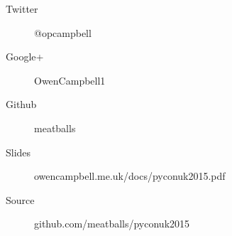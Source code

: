 \documentclass[14pt]{beamer}
\begin{document}
    \begin{frame}{}
      \begin{description}
        \item [Twitter] @opcampbell
        \item [Google+] OwenCampbell1
        \item [Github] meatballs
      \end{description}
      \vfill
      \begin{description}
        \item [Slides] {\small owencampbell.me.uk/docs/pyconuk2015.pdf}
        \item [Source] {\small github.com/meatballs/pyconuk2015}
      \end{description}
    \end{frame}
\end{document}
